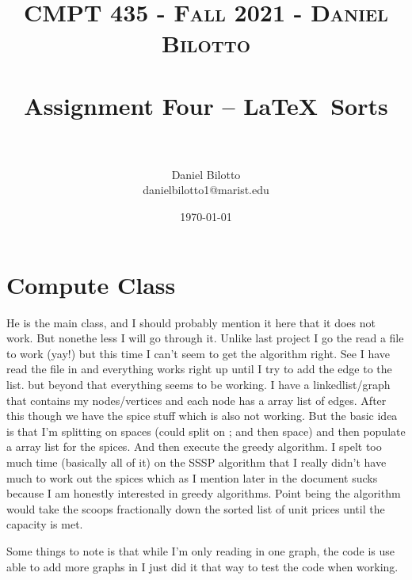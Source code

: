 \documentclass[letterpaper, 10pt]{article}
\title{	
   \normalfont \normalsize 
   \textsc{CMPT 435 - Fall 2021 - Daniel Bilotto} \\[10pt] %
   \horrule{0.5pt} \\[0.25cm] 	%
   \huge Assignment Four -- \LaTeX ~Sorts \\     	    %
   \horrule{0.5pt} \\[0.25cm] 	%
}
\author{Daniel Bilotto \\ \normalsize danielbilotto1@marist.edu}
\date{\normalsize\today} 	%
\begin{document}
\maketitle %



\section{Compute Class}
He is the main class, and I should probably mention it here that it does not work. But nonethe less I will go through it. Unlike last project I go the read a file to work (yay!) but this time I can't seem to get the algorithm right. See I have read the file in and everything works right up until I try to add the edge to the list. but beyond that everything seems to be working. I have a linkedlist/graph that contains my nodes/vertices and each node has a array list of edges. After this though we have the spice stuff which is also not working. But the basic idea is that I'm splitting on spaces (could split on ; and then space) and then populate a array list for the spices. And then execute the greedy algorithm. I spelt too much time (basically all of it) on the SSSP algorithm that I really didn't have much to work out the spices which as I mention later in the document sucks because I am honestly interested in greedy algorithms. Point being the algorithm would take the scoops fractionally down the sorted list of unit prices until the capacity is met. 

Some things to note is that while I'm only reading in one graph, the code is use able to add more graphs in I just did it that way to test the code when working.
\end{document}
